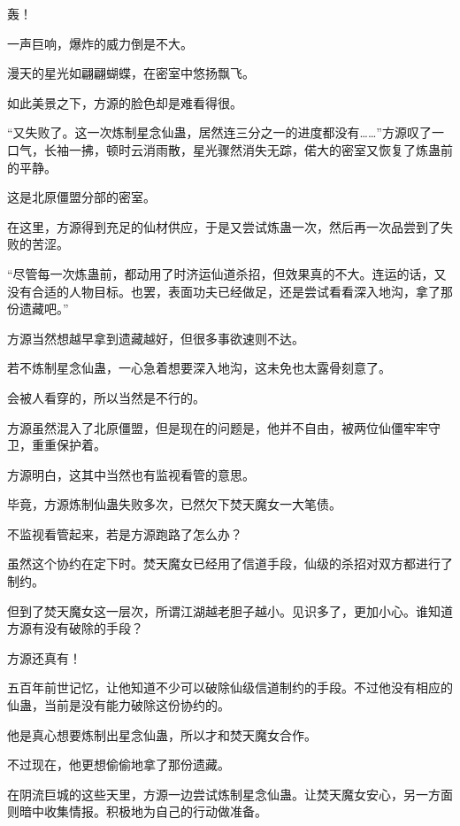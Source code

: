
\begin{this_body}



轰！

一声巨响，爆炸的威力倒是不大。

漫天的星光如翩翩蝴蝶，在密室中悠扬飘飞。

如此美景之下，方源的脸色却是难看得很。

“又失败了。这一次炼制星念仙蛊，居然连三分之一的进度都没有……”方源叹了一口气，长袖一拂，顿时云消雨散，星光骤然消失无踪，偌大的密室又恢复了炼蛊前的平静。

这是北原僵盟分部的密室。

在这里，方源得到充足的仙材供应，于是又尝试炼蛊一次，然后再一次品尝到了失败的苦涩。

“尽管每一次炼蛊前，都动用了时济运仙道杀招，但效果真的不大。连运的话，又没有合适的人物目标。也罢，表面功夫已经做足，还是尝试看看深入地沟，拿了那份遗藏吧。”

方源当然想越早拿到遗藏越好，但很多事欲速则不达。

若不炼制星念仙蛊，一心急着想要深入地沟，这未免也太露骨刻意了。

会被人看穿的，所以当然是不行的。

方源虽然混入了北原僵盟，但是现在的问题是，他并不自由，被两位仙僵牢牢守卫，重重保护着。

方源明白，这其中当然也有监视看管的意思。

毕竟，方源炼制仙蛊失败多次，已然欠下焚天魔女一大笔债。

不监视看管起来，若是方源跑路了怎么办？

虽然这个协约在定下时。焚天魔女已经用了信道手段，仙级的杀招对双方都进行了制约。

但到了焚天魔女这一层次，所谓江湖越老胆子越小。见识多了，更加小心。谁知道方源有没有破除的手段？

方源还真有！

五百年前世记忆，让他知道不少可以破除仙级信道制约的手段。不过他没有相应的仙蛊，当前是没有能力破除这份协约的。

他是真心想要炼制出星念仙蛊，所以才和焚天魔女合作。

不过现在，他更想偷偷地拿了那份遗藏。

在阴流巨城的这些天里，方源一边尝试炼制星念仙蛊。让焚天魔女安心，另一方面则暗中收集情报。积极地为自己的行动做准备。


\end{this_body}
